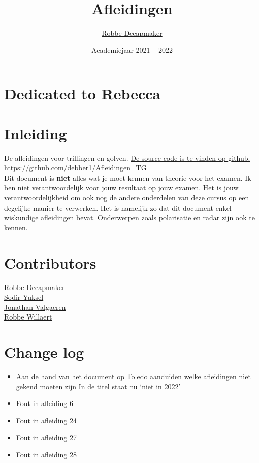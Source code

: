 \documentclass[a4paper,kul]{kulakarticle} %
\date{Academiejaar 2021 -- 2022}
\title{Afleidingen}
\author{\href{https://github.com/debber1}{Robbe Decapmaker}}
\begin{document}
\maketitle
\section*{Dedicated to Rebecca}
\section*{Inleiding}

De afleidingen voor trillingen en golven. \href{https://github.com/debber1/Afleidingen_TG}{De source code is te vinden op github.}\\
https://github.com/debber1/Afleidingen\_TG\\
\newline
Dit document is \textbf{niet} alles wat je moet kennen van theorie voor het examen. Ik ben niet verantwoordelijk voor jouw resultaat op jouw examen. Het is jouw verantwoordelijkheid om ook nog de andere onderdelen van deze cursus op een degelijke manier te verwerken. Het is namelijk zo dat dit document enkel wiskundige afleidingen bevat. Onderwerpen zoals polarisatie en radar zijn ook te kennen.\\

\section*{Contributors}
\href{https://github.com/debber1}{Robbe Decapmaker}\\
\href{https://github.com/sydon1}{Sodir Yuksel} \\
\href{https://github.com/ItsAlphie}{Jonathan Valgaeren}\\
\href{https://github.com/Robope}{Robbe Willaert}
\section*{Change log}
\begin{itemize}
	\item Aan de hand van het document op Toledo aanduiden welke afleidingen niet gekend moeten zijn 
	\subitem In de titel staat nu `niet in 2022'
	\item \href{https://github.com/debber1/Afleidingen_TG/issues/16}{Fout in afleiding 6}
	\item \href{https://github.com/debber1/Afleidingen_TG/issues/17}{Fout in afleiding 24}
	\item \href{https://github.com/debber1/Afleidingen_TG/issues/18}{Fout in afleiding 27}
	\item \href{https://github.com/debber1/Afleidingen_TG/issues/19}{Fout in afleiding 28}
\end{itemize}
\newpage
\end{document}
